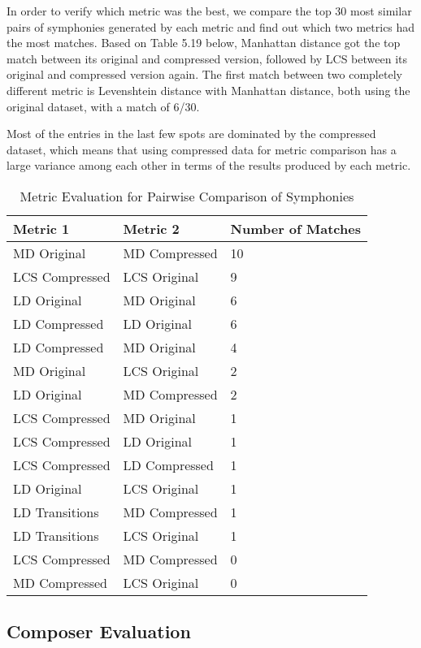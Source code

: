 In order to verify which metric was the best, we compare the top 30 most similar pairs of symphonies generated by each metric and find out which two metrics had the most matches. Based on Table 5.19 below, Manhattan distance got the top match between its original and compressed version, followed by LCS between its original and compressed version again. The first match between two completely different metric is Levenshtein distance with Manhattan distance, both using the original dataset, with a match of 6/30.

Most of the entries in the last few spots are dominated by the compressed dataset, which means that using compressed data for metric comparison has a large variance among each other in terms of the results produced by each metric.

\begin{longtable}{|l|l|l|}
\caption{Metric Evaluation for Pairwise Comparison of Symphonies}
\label{my-label}\\
\hline
Metric 1 & Metric 2 & Number of Matches \\ \hline
\endfirsthead
%
\endhead
%
MD Original & MD Compressed & 10 \\ \hline
LCS Compressed & LCS Original & 9 \\ \hline
LD Original & MD Original & 6 \\ \hline
LD Compressed & LD Original & 6 \\ \hline
LD Compressed & MD Original & 4 \\ \hline
MD Original & LCS Original & 2 \\ \hline
LD Original & MD Compressed & 2 \\ \hline
LCS Compressed & MD Original & 1 \\ \hline
LCS Compressed & LD Original & 1 \\ \hline
LCS Compressed & LD Compressed & 1 \\ \hline
LD Original & LCS Original & 1 \\ \hline
LD Transitions & MD Compressed & 1 \\ \hline
LD Transitions & LCS Original & 1 \\ \hline
LCS Compressed & MD Compressed & 0 \\ \hline
MD Compressed & LCS Original & 0 \\ \hline
\end{longtable}

\subsection{Composer Evaluation}


